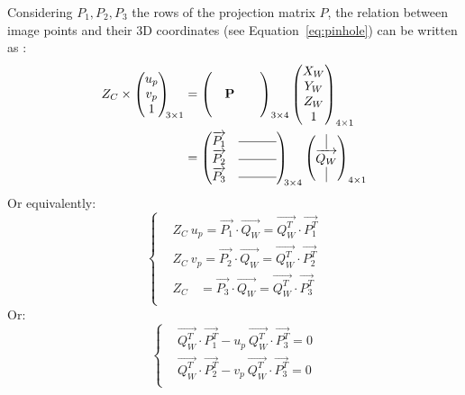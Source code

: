 Considering $P_1, P_2, P_3$ the rows of the projection matrix $P$, the relation between image points and their 3D coordinates (see Equation~\ref{eq:pinhole}) can be written as \cite{Hartley2003} :
\begin{equation}
  \begin{aligned}
    Z_C \times \begin{pmatrix}u_p\\v_p\\1 \end{pmatrix}_{\!\!3\times 1} 
    &= \begin{pmatrix}&&&\\&\textbf{P}&\\&&& \end{pmatrix}_{3 \times 4} 
    \begin{pmatrix} X_W \\ Y_W \\ Z_W \\ 1 \end{pmatrix}_{4\times 1}\\
    &= \begin{pmatrix}\overrightarrow{P_1} & \rule[.5ex]{3.em}{0.4pt}\\   
      \overrightarrow{P_2} &\rule[.5ex]{3.em}{0.4pt} \\ 
      \overrightarrow{P_3} &\rule[.5ex]{3.em}{0.4pt}\end{pmatrix}_{\!\!3\times 4}
      \begin{pmatrix} \vline \\ \overrightarrow{Q_W} \\ \vline \end{pmatrix}_{4\times 1}
  \end{aligned}
  \end{equation}
  Or equivalently:
  \begin{equation}
    \begin{cases}
      & Z_C \ u_p = \overrightarrow{P_1} \cdot \overrightarrow{Q_W} = \overrightarrow{Q_W^T} \cdot \overrightarrow{P_1^T}\\
      & Z_C \ v_p = \overrightarrow{P_2} \cdot \overrightarrow{Q_W} = \overrightarrow{Q_W^T} \cdot \overrightarrow{P_2^T}\\
      & Z_C \ \ \ \ = \overrightarrow{P_3} \cdot \overrightarrow{Q_W} = \overrightarrow{Q_W^T} \cdot \overrightarrow{P_3^T}\\
    \end{cases}
  \end{equation}
  Or:
  \begin{equation}
    \begin{cases}
      & \overrightarrow{Q_W^T} \cdot \overrightarrow{P_1^T} - u_p \ \overrightarrow{Q_W^T} \cdot \overrightarrow{P_3^T} = 0\\
      & \overrightarrow{Q_W^T} \cdot \overrightarrow{P_2^T} - v_p \ \overrightarrow{Q_W^T} \cdot \overrightarrow{P_3^T} = 0\\
    \end{cases}
  \end{equation}
